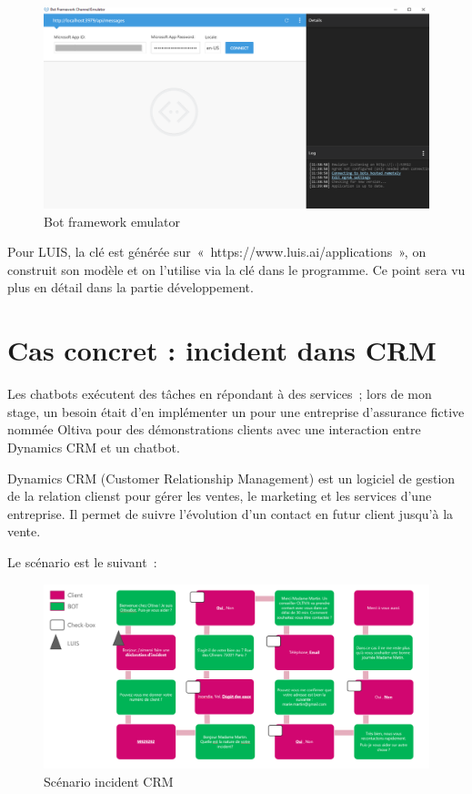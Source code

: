\begin{figure}[H]
	\centering
		\includegraphics[width = \textwidth]{emulateur.png}
	\caption{Bot framework emulator}
	\label{fig:Bot framework emulator}
\end{figure}

 Pour LUIS, la clé est générée sur « https://www.luis.ai/applications », on construit son modèle et on l’utilise via la clé dans le programme. Ce point sera vu plus en détail dans la partie développement.

\section{Cas concret : incident dans CRM}

Les chatbots exécutent des tâches en répondant à des services ;  lors de mon stage, un besoin était d’en implémenter un pour une entreprise d’assurance fictive nommée Oltiva pour des démonstrations clients avec une interaction entre Dynamics CRM et un chatbot.
\vspace{1em}

Dynamics CRM (Customer Relationship Management) est un logiciel de gestion de la relation clienst pour gérer les ventes, le marketing et les services d’une entreprise. Il permet de suivre l’évolution d’un contact en futur client jusqu’à la vente.
\vspace{1em}

Le scénario est le suivant : 

\begin{figure}[H]
	\centering
		\includegraphics[width = \textwidth]{scenario.png}
	\caption{Scénario incident CRM}
	\label{fig:Scénario incident CRM}
\end{figure}


